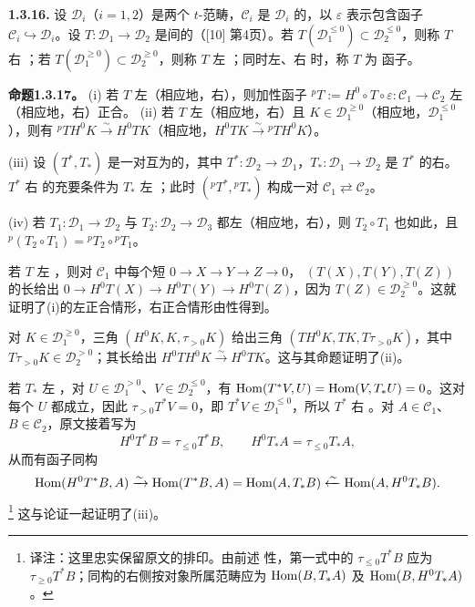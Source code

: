 \par\medskip\noindent\textbf{1.3.16.} 设 $\mathcal D_i$（$i=1,2$）是两个 $t$-范畴，$\mathcal C_i$ 是 $\mathcal D_i$ 的，以 $\varepsilon$ 表示包含函子 $\mathcal C_i\hookrightarrow\mathcal D_i$。设 $T:\mathcal D_1\to\mathcal D_2$ 是间的（[10] 第4页）。若 $T(\mathcal D_1^{\leq0})\subset\mathcal D_2^{\leq0}$，则称 $T$ 右 ；若 $T(\mathcal D_1^{\geq0})\subset\mathcal D_2^{\geq0}$，则称 $T$ 左 ；同时左、右 时，称 $T$ 为 函子。

\par\medskip\noindent\textbf{命题1.3.17。} (i) 若 $T$ 左（相应地，右），则加性函子 ${}^pT:=H^0\circ T\circ\varepsilon:\mathcal C_1\to\mathcal C_2$ 左（相应地，右）正合。
(ii) 若 $T$ 左（相应地，右）且 $K\in\mathcal D_1^{\geq0}$（相应地，$\mathcal D_1^{\leq0}$），则有 ${}^pTH^0K\xrightarrow{\sim}H^0TK$（相应地，$H^0TK\xrightarrow{\sim}{}^pTH^0K$）。

(iii) 设 $(T^*,T_*)$ 是一对互为的，其中 $T^*:\mathcal D_2\to\mathcal D_1$，$T_*:\mathcal D_1\to\mathcal D_2$ 是 $T^*$ 的右。$T^*$ 右 的充要条件为 $T_*$ 左 ；此时 $({}^pT^*,{}^pT_*)$ 构成一对 $\mathcal C_1\rightleftarrows\mathcal C_2$。

(iv) 若 $T_1:\mathcal D_1\to\mathcal D_2$ 与 $T_2:\mathcal D_2\to\mathcal D_3$ 都左（相应地，右），则 $T_2\circ T_1$ 也如此，且 ${}^p(T_2\circ T_1)={}^pT_2\circ{}^pT_1$。

若 $T$ 左 ，则对 $\mathcal C_1$ 中每个短 $0\to X\to Y\to Z\to0$， $(T(X),T(Y),T(Z))$ 的长给出 $0\to H^0T(X)\to H^0T(Y)\to H^0T(Z)$，因为 $T(Z)\in\mathcal D_2^{\geq0}$。这就证明了(i)的左正合情形，右正合情形由性得到。

对 $K\in\mathcal D_1^{\geq0}$，三角 $(H^0K,K,\tau_{>0}K)$ 给出三角 $(TH^0K,TK,T\tau_{>0}K)$，其中 $T\tau_{>0}K\in\mathcal D_2^{>0}$；其长给出 $H^0TH^0K\xrightarrow{\sim}H^0TK$。这与其命题证明了(ii)。

若 $T_*$ 左 ，对 $U\in\mathcal D_1^{>0}$、$V\in\mathcal D_2^{\leq0}$，有 $\operatorname{Hom}(T^*V,U)=\operatorname{Hom}(V,T_*U)=0$。这对每个 $U$ 都成立，因此 $\tau_{>0}T^*V=0$，即 $T^*V\in\mathcal D_1^{\leq0}$，所以 $T^*$ 右 。对 $A\in\mathcal C_1$、$B\in\mathcal C_2$，原文接着写为
\[
 H^0T^*B=\tau_{\leq0}T^*B,\qquad H^0T_*A=\tau_{\leq0}T_*A,
\]
从而有函子同构
\[
 \operatorname{Hom}(H^0T^*B,A)\xrightarrow{\sim}\operatorname{Hom}(T^*B,A)
 =\operatorname{Hom}(A,T_*B)\xleftarrow{\sim}\operatorname{Hom}(A,H^0T_*B).
\]
\footnote{译注：这里忠实保留原文的排印。由前述 性，第一式中的 $\tau_{\leq0}T^*B$ 应为 $\tau_{\geq0}T^*B$；同构的右侧按对象所属范畴应为 $\operatorname{Hom}(B,T_*A)$ 及 $\operatorname{Hom}(B,H^0T_*A)$。}
这与论证一起证明了(iii)。

